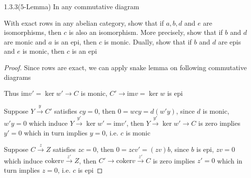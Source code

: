 \documentclass[../main.tex]{subfiles}
\begin{document}
\begin{customexercise}{1.3.3}($5$-Lemma) In any commutative diagram
\begin{center}
\end{center}
With exact rows in any abelian category, show that if $a,b,d$ and $e$ are isomorphisms, then $c$ is also an isomorphism. More precisely, show that if $b$ and $d$ are monic and $a$ is an epi, then $c$ is monic. Dually, show that if $b$ and $d$ are epis and $e$ is monic, then $c$ is an epi
\end{customexercise}

\begin{proof}
Since rows are exact, we can apply snake lemma on following commutative diagrams
\begin{center}
\end{center}
\begin{center}
\end{center}
Thus $\mathrm{im}v'=\ker w'\to C$ is monic, $C'\to\mathrm{im}v=\ker w$ is epi \par
Suppose $Y\xrightarrow{y}C'$ satisfies $cy=0$, then $0=wcy=d(w'y)$, since $d$ is monic, $w'y=0$ which induce $Y\xrightarrow{y'}\ker w'=\mathrm{im}v'$, then $Y\xrightarrow{y'}\ker w'\to C$ is zero implies $y'=0$ which in turn implies $y=0$, i.e. $c$ is monic \par
Suppose $C\xrightarrow{z}Z$ satisfies $zc=0$, then $0=zcv'=(zv)b$, since $b$ is epi, $zv=0$ which induce 
$\mathrm{coker}v\xrightarrow{z'}Z$, then $C'\to\mathrm{coker}v\xrightarrow{z'}C$ is zero implies $z'=0$ which in turn implies $z=0$, i.e. $c$ is epi
\end{proof}
\end{document}
